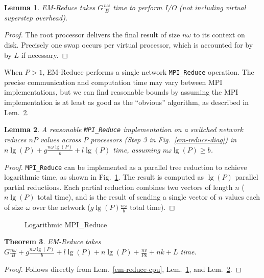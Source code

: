 \documentclass[12pt]{carletoncsthesis}
\newtheorem{thm}{Theorem}[section]
\newtheorem{lemma}[thm]{Lemma}
\begin{document}
\begin{lemma}
\label{em-reduce-io}
{\sc EM-Reduce} takes $G\frac{n\omega}{B}$ time to perform I/O
(not including virtual superstep overhead).
\end{lemma}
\begin{proof}
The root processor delivers the final result of size $n\omega$ to its context
on disk.  Precisely one swap occurs per virtual processor, which is accounted
for by by $L$ if necessary.
\end{proof}

When $P>1$, {\sc EM-Reduce} performs a single network {\tt MPI\_Reduce}
operation.  The precise communication and computation time may vary
between MPI implementations, but we can find reasonable bounds by assuming
the MPI implementation is at least as good as the ``obvious'' algorithm, as
described in Lem.~\ref{mpi-reduce-time}.

\begin{lemma}
\label{mpi-reduce-time}
A reasonable {\tt MPI\_Reduce} implementation on a switched network reduces
$nP$ values across $P$ processors (Step 3 in Fig.~\ref{em-reduce-diag}) in
$n\lg(P) + g\frac{n\omega\lg(P)}{b} + l\lg(P)$ time, assuming $n\omega\lg(P)
\ge b$.
\end{lemma}
\begin{proof}
{\tt MPI\_Reduce} can be implemented as a parallel tree reduction to achieve
logarithmic time, as shown in Fig.~\ref{mpi-reduce}.  The result is computed
as $\lg(P)$ parallel partial reductions.  Each partial reduction combines
two vectors of length $n$ ($n\lg(P)$ total time), and is the result of
sending a single vector of $n$ values each of size $\omega$ over the network
($g\lg(P){\frac{n\omega}{b}}$ total time).
\end{proof}

\begin{figure}[ht]
\begin{center}
\caption{Logarithmic {\sc MPI\_Reduce}}
\label{mpi-reduce}
\end{center}
\end{figure}

\begin{thm}
\label{em-reduce-time}
{\sc EM-Reduce} takes $G\frac{n\omega}{B} + g\frac{n\omega\lg(P)}{b} +
l\lg(P) + n\lg(P) + \frac{nv}{Pk} + nk + L$ time.
\end{thm}
\begin{proof}
Follows directly from Lem.~\ref{em-reduce-cpu}, Lem.~\ref{em-reduce-io},
and Lem.~\ref{mpi-reduce-time}.
\end{proof}
\end{document}
